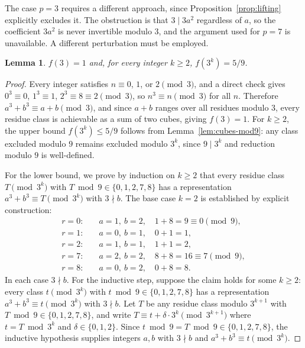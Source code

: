 \documentclass[12pt]{amsart}
\newtheorem{lemma}{Lemma}
\theoremstyle{definition}
\theoremstyle{remark}
\begin{document}
The case $p = 3$ requires a different approach, since
Proposition~\ref{prop:lifting} explicitly excludes it. The obstruction
is that $3 \mid 3a^2$ regardless of $a$, so the coefficient $3a^2$ is
never invertible modulo $3$, and the argument used for $p = 7$ is
unavailable. A different perturbation must be employed.

\begin{lemma}\label{lem:f-3}
$f(3) = 1$ and, for every integer $k \ge 2$, $f(3^k) = 5/9$.
\end{lemma}

\begin{proof}
Every integer satisfies $n \equiv 0$, $1$, or $2 \pmod{3}$, and a direct
check gives $0^3 \equiv 0$, $1^3 \equiv 1$, $2^3 \equiv 8 \equiv 2
\pmod{3}$, so $n^3 \equiv n \pmod{3}$ for all $n$. Therefore
$a^3 + b^3 \equiv a + b \pmod{3}$, and since $a + b$ ranges over all
residues modulo $3$, every residue class is achievable as a sum of two
cubes, giving $f(3) = 1$.  For
$k \ge 2$, the upper bound $f(3^k) \le 5/9$ follows from
Lemma~\ref{lem:cubes-mod9}: any class excluded modulo $9$ remains
excluded modulo $3^k$, since $9 \mid 3^k$ and reduction modulo $9$ is
well-defined.

For the lower bound, we prove by induction on $k \ge 2$ that every
residue class $T \pmod{3^k}$ with $T \bmod 9 \in \{0,1,2,7,8\}$ has a
representation $a^3 + b^3 \equiv T \pmod{3^k}$ with $3 \nmid b$. The
base case $k = 2$ is established by explicit construction:
\begin{align*}
r = 0: &\quad a = 1,\ b = 2,\quad 1 + 8 = 9 \equiv 0 \pmod{9},\\
r = 1: &\quad a = 0,\ b = 1,\quad 0 + 1 = 1,\\
r = 2: &\quad a = 1,\ b = 1,\quad 1 + 1 = 2,\\
r = 7: &\quad a = 2,\ b = 2,\quad 8 + 8 = 16 \equiv 7 \pmod{9},\\
r = 8: &\quad a = 0,\ b = 2,\quad 0 + 8 = 8.
\end{align*}
In each case $3 \nmid b$. For the inductive step, suppose the claim holds
for some $k \ge 2$: every class $t \pmod{3^k}$ with $t \bmod 9 \in
\{0,1,2,7,8\}$ has a representation $a^3 + b^3 \equiv t \pmod{3^k}$
with $3 \nmid b$. Let $T$ be any residue class modulo $3^{k+1}$ with
$T \bmod 9 \in \{0,1,2,7,8\}$, and write $T \equiv t + \delta \cdot 3^k
\pmod{3^{k+1}}$ where $t = T \bmod 3^k$ and $\delta \in \{0,1,2\}$.
Since $t \bmod 9 = T \bmod 9 \in \{0,1,2,7,8\}$, the inductive
hypothesis supplies integers $a, b$ with $3 \nmid b$ and
$a^3 + b^3 \equiv t \pmod{3^k}$.


\end{proof}
\end{document}
